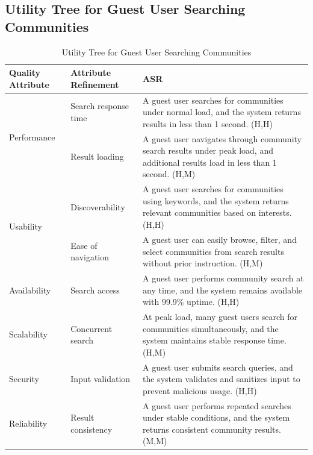 \documentclass{article}
\begin{document}
\subsection{Utility Tree for Guest User Searching Communities}

\begin{table}[H]
\centering
\caption{Utility Tree for Guest User Searching Communities}
\begin{tabular}{|p{3cm}|p{4cm}|p{7cm}|}
\hline
\textbf{Quality Attribute} & \textbf{Attribute Refinement} & \textbf{ASR} \\
\hline

\multirow{2}{*}{Performance}
& Search response time
& A guest user searches for communities under normal load, and the system returns results in less than 1 second. (H,H) \\
\cline{2-3}
& Result loading
& A guest user navigates through community search results under peak load, and additional results load in less than 1 second. (H,M) \\
\hline

\multirow{2}{*}{Usability}
& Discoverability
& A guest user searches for communities using keywords, and the system returns relevant communities based on interests. (H,H) \\
\cline{2-3}
& Ease of navigation
& A guest user can easily browse, filter, and select communities from search results without prior instruction. (H,M) \\
\hline

Availability
& Search access
& A guest user performs community search at any time, and the system remains available with 99.9\% uptime. (H,H) \\
\hline

Scalability
& Concurrent search
& At peak load, many guest users search for communities simultaneously, and the system maintains stable response time. (H,M) \\
\hline

Security
& Input validation
& A guest user submits search queries, and the system validates and sanitizes input to prevent malicious usage. (H,H) \\
\hline

Reliability
& Result consistency
& A guest user performs repeated searches under stable conditions, and the system returns consistent community results. (M,M) \\
\hline

\end{tabular}
\end{table}
\end{document}
